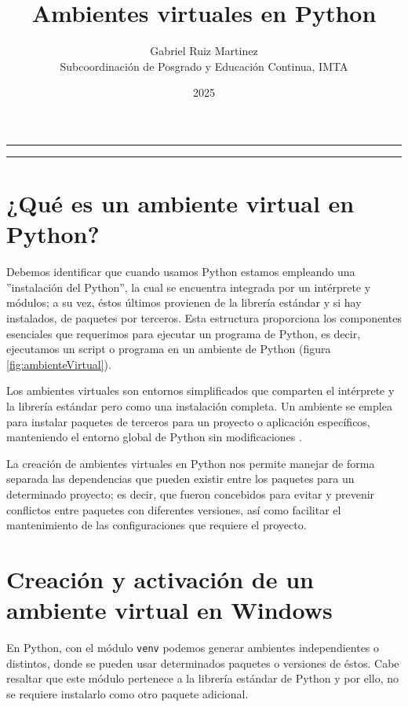 \documentclass{article}
\title{\textbf{Ambientes virtuales en Python}}
\date{2025}
\author{Gabriel Ruiz Martinez\\ Subcoordinación de Posgrado y Educación Continua, IMTA}
\begin{document}
	\renewcommand{\contentsname}{Contenido} 

	\maketitle
	
	\vspace{0.25cm}
	\hrule height 1pt
	
	\tableofcontents
	
	\vspace{0.25cm}
	\hrule
	
	\section{¿Qué es un ambiente virtual en Python?}
	
	Debemos identificar que cuando usamos Python estamos empleando una ''instalación del Python'', la cual se encuentra integrada por un intérprete y módulos; a su vez, éstos últimos provienen de la librería estándar y si hay instalados, de paquetes por terceros. Esta estructura proporciona los componentes esenciales que requerimos para ejecutar un programa de Python, es decir, ejecutamos un script o programa en un ambiente de Python (figura \ref{fig:ambienteVirtual}).\bigskip
	
	Los ambientes virtuales son entornos simplificados que comparten el intérprete y la librería estándar pero como una instalación completa. Un ambiente se emplea para instalar paquetes de terceros para un proyecto o aplicación específicos, manteniendo el entorno global de Python sin modificaciones \citep{jolowicz2024}.\bigskip
	
	La creación de ambientes virtuales en Python nos permite manejar de forma separada las dependencias que pueden existir entre los paquetes para un determinado proyecto; es decir, que fueron concebidos para evitar y prevenir conflictos entre paquetes con diferentes versiones, así como facilitar el mantenimiento de las configuraciones que requiere el proyecto.
	
	\section{Creación y activación de un ambiente virtual en Windows}
	En Python, con el módulo \texttt{venv} podemos generar ambientes independientes o distintos, donde se pueden usar determinados paquetes o versiones de éstos. Cabe resaltar que este módulo pertenece a la librería estándar de Python y por ello, no se requiere instalarlo como otro paquete adicional.\bigskip
	
\end{document}
